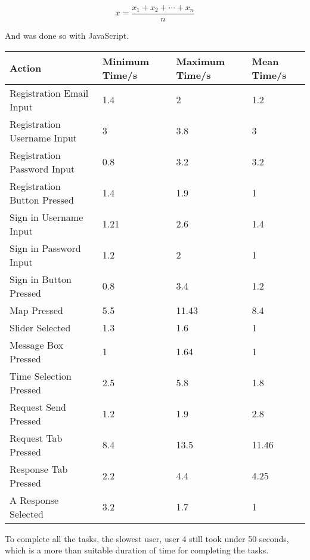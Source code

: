 \documentclass[a4paper]{article}
\begin{document}
\begin{equation}
 \bar{x} = \frac{x_1+x_2+\cdots +x_n}{n} 
 \end{equation}
 
And was done so with JavaScript.


\begin{table}[H]
\centering
    \begin{tabular}{llll}
    Action                      & Minimum Time/s & Maximum Time/s & Mean Time/s \\ \hline
    Registration Email Input    & 1.4          & 2            & 1.2       \\
    Registration Username Input & 3            & 3.8          & 3         \\
    Registration Password Input & 0.8          & 3.2          & 3.2       \\ 
    Registration Button Pressed & 1.4          & 1.9          & 1         \\
    Sign in Username Input      & 1.21         & 2.6          & 1.4       \\
    Sign in Password Input      & 1.2          & 2            & 1         \\
    Sign in Button Pressed      & 0.8          & 3.4          & 1.2       \\
    Map Pressed                 & 5.5          & 11.43        & 8.4       \\
    Slider Selected             & 1.3          & 1.6          & 1         \\
    Message Box Pressed         & 1            & 1.64         & 1         \\
    Time Selection Pressed      & 2.5          & 5.8          & 1.8       \\ 
    Request Send Pressed        & 1.2          & 1.9          & 2.8       \\
    Request Tab Pressed         & 8.4         & 13.5         & 11.46       \\
    Response Tab Pressed        & 2.2          & 4.4          & 4.25      \\ 
    A Response Selected         & 3.2          & 1.7          & 1         \\ 
    \end{tabular}
\end{table}


To complete all the tasks, the slowest user, user 4 still took under 50 seconds, which is a more than suitable duration of time for completing the tasks.
\end{document}
